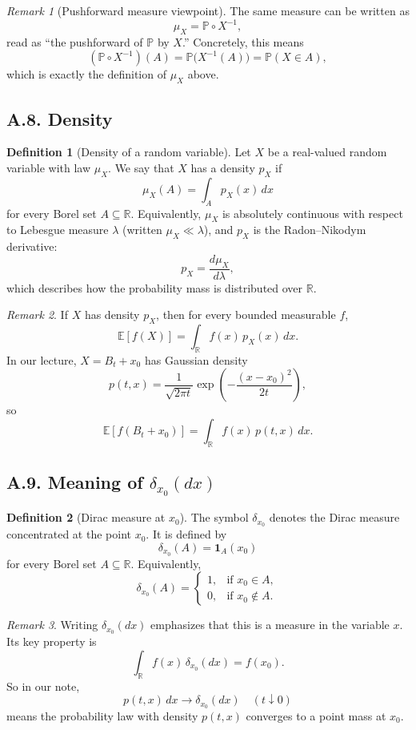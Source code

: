 \documentclass[11pt]{article}
\theoremstyle{definition}
\newtheorem{definition}{Definition}
\theoremstyle{remark}
\newtheorem{remark}{Remark}
\begin{document}
\begin{remark}[Pushforward measure viewpoint]
The same measure can be written as
\[
\mu_X = \mathbb P\circ X^{-1},
\]
read as ``the pushforward of $\mathbb P$ by $X$.'' Concretely, this means
\[
(\mathbb P\circ X^{-1})(A)=\mathbb P\!\bigl(X^{-1}(A)\bigr)=\mathbb P(X\in A),
\]
which is exactly the definition of $\mu_X$ above.
\end{remark}

\subsection*{A.8. Density}
\begin{definition}[Density of a random variable]
Let $X$ be a real-valued random variable with law $\mu_X$. We say that $X$ has a density $p_X$ if
\[
\mu_X(A)=\int_A p_X(x)\,dx
\]
for every Borel set $A\subseteq\mathbb R$.
Equivalently, $\mu_X$ is absolutely continuous with respect to Lebesgue measure $\lambda$ (written $\mu_X\ll\lambda$), and $p_X$ is the Radon--Nikodym derivative:
\[
p_X=\frac{d\mu_X}{d\lambda},
\]
which describes how the probability mass is distributed over $\mathbb R$.
\end{definition}

\begin{remark}
If $X$ has density $p_X$, then for every bounded measurable $f$,
\[
\mathbb E[f(X)]=\int_{\mathbb R} f(x)\,p_X(x)\,dx.
\]
In our lecture, $X=B_t+x_0$ has Gaussian density
\[
p(t,x)=\frac{1}{\sqrt{2\pi t}}\exp\!\left(-\frac{(x-x_0)^2}{2t}\right),
\]
so
\[
\mathbb E[f(B_t+x_0)]=\int_{\mathbb R} f(x)\,p(t,x)\,dx.
\]
\end{remark}

\subsection*{A.9. Meaning of $\delta_{x_0}(dx)$}
\begin{definition}[Dirac measure at $x_0$]
The symbol $\delta_{x_0}$ denotes the Dirac measure concentrated at the point $x_0$. It is defined by
\[
\delta_{x_0}(A)=\mathbf 1_A(x_0)
\]
for every Borel set $A\subseteq\mathbb R$. Equivalently,
\[
\delta_{x_0}(A)=
\begin{cases}
1, & \text{if } x_0\in A,\\
0, & \text{if } x_0\notin A.
\end{cases}
\]
\end{definition}

\begin{remark}
Writing $\delta_{x_0}(dx)$ emphasizes that this is a measure in the variable $x$. Its key property is
\[
\int_{\mathbb R} f(x)\,\delta_{x_0}(dx)=f(x_0).
\]
So in our note,
\[
p(t,x)\,dx\to\delta_{x_0}(dx)\quad (t\downarrow0)
\]
means the probability law with density $p(t,x)$ converges to a point mass at $x_0$.
\end{remark}
\end{document}
